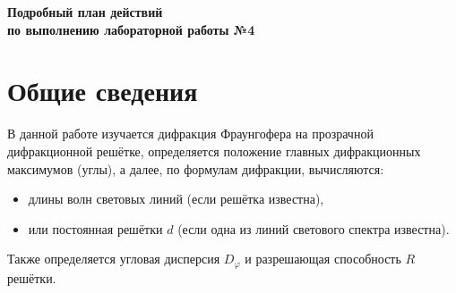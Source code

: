 \documentclass[a4paper,12pt]{article}
\begin{document}
\begin{center}
  \Large \textbf{Подробный план действий \\
  по выполнению лабораторной работы №4}
\end{center}

\vspace{1em}

\section*{Общие сведения}
В данной работе изучается дифракция Фраунгофера на прозрачной дифракционной решётке, определяется положение главных дифракционных максимумов (углы), а далее, по формулам дифракции, вычисляются:
\begin{itemize}
  \item длины волн световых линий (если решётка известна),
  \item или постоянная решётки $d$ (если одна из линий светового спектра известна).
\end{itemize}
Также определяется угловая дисперсия $D_\varphi$ и разрешающая способность $R$ решётки.
\end{document}
